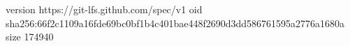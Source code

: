 version https://git-lfs.github.com/spec/v1
oid sha256:66f2c1109a16fde69bc0bf1b4c401bae448f2690d3dd586761595a2776a1680a
size 174940
